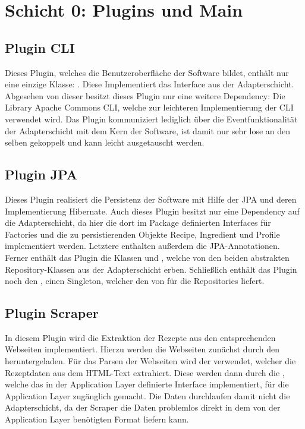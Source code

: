 \section{Schicht 0: Plugins und Main}

\subsection{Plugin CLI}
Dieses Plugin, welches die Benutzeroberfläche der Software bildet, enthält nur eine einzige Klasse: . Diese Implementiert das Interface  aus der Adapterschicht. Abgesehen von dieser besitzt dieses Plugin nur eine weitere Dependency: Die Library Apache Commons CLI, welche zur leichteren Implementierung der CLI verwendet wird. Das Plugin kommuniziert lediglich über die Eventfunktionalität der Adapterschicht mit dem Kern der Software, ist damit nur sehr lose an den selben gekoppelt und kann leicht ausgetauscht werden.

\subsection{Plugin JPA}
Dieses Plugin realisiert die Persistenz der Software mit Hilfe der \ac{JPA} und deren Implementierung Hibernate. Auch dieses Plugin besitzt nur eine Dependency auf die Adapterschicht, da hier die dort im Package  definierten Interfaces für Factories und die zu persistierenden Objekte Recipe, Ingredient und Profile implementiert werden. Letztere enthalten außerdem die \ac{JPA}-Annotationen. Ferner enthält das Plugin die Klassen  und , welche von den beiden abstrakten Repository-Klassen aus der Adapterschicht erben. Schließlich enthält das Plugin noch den , einen Singleton, welcher den  von  für die Repositories liefert.

\subsection{Plugin Scraper}
In diesem Plugin wird die Extraktion der Rezepte aus den entsprechenden Webseiten implementiert. Hierzu werden die Webseiten zunächst durch den  heruntergeladen. Für das Parsen der Webseiten wird der  verwendet, welcher die Rezeptdaten aus dem HTML-Text extrahiert. Diese werden dann durch die , welche das in der Application Layer definierte Interface  implementiert, für die Application Layer zugänglich gemacht. Die Daten durchlaufen damit nicht die Adapterschicht, da der Scraper die Daten problemlos direkt in dem von der Application Layer benötigten Format liefern kann.

